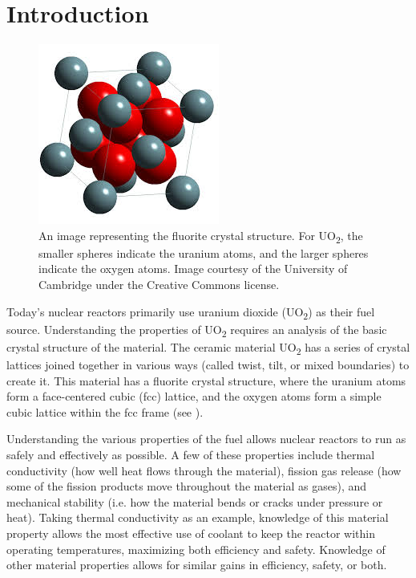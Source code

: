\documentclass[12pt]{report}
\begin{document}
\chapter{Introduction\label{intro}}
\begin{figure}
\vspace{-20pt}
\centering
\includegraphics[scale=0.7]{Images/UO2}
\vspace{-10pt}
\caption[Example of the fluorite crystal structure.]{\label{fig:uo2Lattice}An image representing the fluorite crystal structure.  For UO\textsubscript{2}, the smaller spheres indicate the uranium atoms, and the larger spheres indicate the oxygen atoms.  Image courtesy of the University of Cambridge under the Creative Commons license.}
\vspace{-10pt}
\end{figure}
Today's nuclear reactors primarily use uranium dioxide (UO\textsubscript{2}) as their fuel source.\cite{uraniumInfo}  Understanding the properties of UO\textsubscript{2} requires an analysis of the basic crystal structure of the material.  The ceramic material UO\textsubscript{2} has a series of crystal lattices joined together in various ways (called twist, tilt, or mixed boundaries) to create it.  This material has a fluorite crystal structure, where the uranium atoms form a face-centered cubic (fcc) lattice, and the oxygen atoms form a simple cubic lattice within the fcc frame (see ).

Understanding the various properties of the fuel allows nuclear reactors to run as safely and effectively as possible.  A few of these properties include thermal conductivity (how well heat flows through the material), fission gas release (how some of the fission products move throughout the material as gases), and mechanical stability (i.e. how the material bends or cracks under pressure or heat).  Taking thermal conductivity as an example, knowledge of this material property allows the most effective use of coolant to keep the reactor within operating temperatures, maximizing both efficiency and safety.  Knowledge of other material properties allows for similar gains in efficiency, safety, or both.
\end{document}
